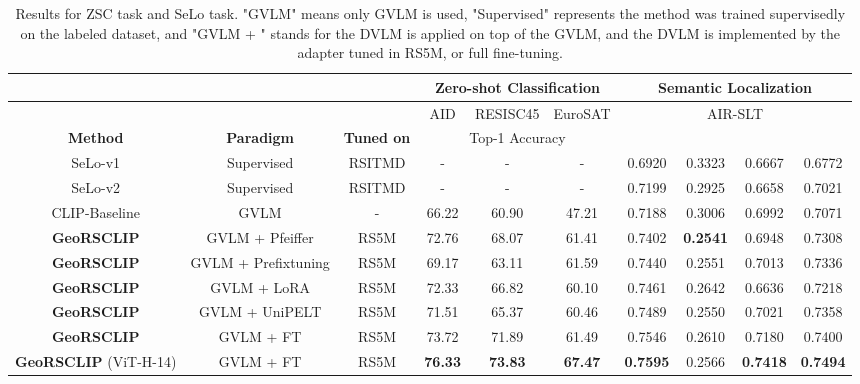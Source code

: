 \documentclass[journal]{IEEEtran}
\begin{document}
\begin{table*}
\caption{Results for ZSC task and SeLo task. "GVLM" means only GVLM is used, "Supervised" represents the method was trained supervisedly on the labeled dataset, and "GVLM + " stands for the DVLM is applied on top of the GVLM, and the DVLM is implemented by the adapter tuned in RS5M, or full fine-tuning.}
\label{table:zsc_selo}
\centering
\small
\begin{tabular}{cccccccccc}
\toprule
\multicolumn{3}{c}{} & \multicolumn{3}{c}{\textbf{Zero-shot Classification}} & \multicolumn{4}{c}{\textbf{Semantic Localization}} \\
\midrule
\multicolumn{3}{c}{\textbf{}} & AID & RESISC45 & EuroSAT & \multicolumn{4}{c}{AIR-SLT} \\
\midrule
\textbf{\textbf{Method}} & \textbf{\textbf{Paradigm}} & \textbf{\textbf{Tuned on}} & \multicolumn{3}{c}{Top-1 Accuracy} & {} & {} & {} & {} \\
\midrule
SeLo-v1 \cite{selo} & Supervised & RSITMD & - & - & - & 0.6920 & 0.3323 & 0.6667 & 0.6772\\
SeLo-v2 \cite{selov2} & Supervised & RSITMD & - & - & - & 0.7199 & 0.2925 & 0.6658 & 0.7021\\
CLIP-Baseline \cite{clip} & GVLM & - & 66.22  & 60.90 & 47.21 &0.7188 &	0.3006	& 0.6992 &	0.7071  \\
\textbf{GeoRSCLIP} & GVLM + Pfeiffer & RS5M  & 72.76 & 68.07 & 61.41 & 0.7402 & \textbf{0.2541}  & 0.6948 & 0.7308\\
\textbf{GeoRSCLIP}& GVLM + Prefix\-tuning & RS5M  & 69.17 & 63.11 & 61.59 & 0.7440  & 0.2551 & 0.7013 & 0.7336 \\
\textbf{GeoRSCLIP}& GVLM + LoRA & RS5M & 72.33 & 66.82 & 60.10 & 0.7461 & 0.2642  & 0.6636 & 0.7218\\
\textbf{GeoRSCLIP}& GVLM + UniPELT & RS5M  & 71.51 & 65.37 & 60.46 & 0.7489  & 0.2550 & 0.7021 & 0.7358\\
\textbf{GeoRSCLIP} & GVLM + FT & RS5M & 73.72 & 71.89 & 61.49 & 0.7546	& 0.2610	 & 0.7180		& 0.7400\\
\textbf{GeoRSCLIP} (ViT-H-14) & GVLM + FT & RS5M & \textbf{76.33} & \textbf{73.83} & \textbf{67.47}  & \textbf{0.7595} &	0.2566	 & \textbf{0.7418} & \textbf{0.7494} \\
\bottomrule
\end{tabular}
\end{table*}
\end{document}
